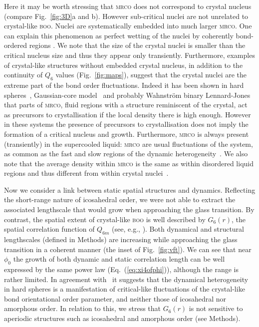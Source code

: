 Here it may be worth stressing that \textsc{mrco} does not correspond to crystal nucleus (compare Fig.~\ref{fig:3D}a and b). However sub-critical nuclei are not unrelated to crystal-like \textsc{boo}. Nuclei are systematically embedded into much larger \textsc{mrco}. One can explain this phenomenon as perfect wetting of the nuclei by coherently bond-ordered regions \cite{Kawasaki2010c}. 
We note that the size of the crystal nuclei is smaller than the critical nucleus size and thus they appear only transiently. 
Furthermore, examples of crystal-like structures without embedded crystal nucleus, in addition to the continuity of $Q_6$ values (Fig.~\ref{fig:maps}), suggest that the crystal nuclei are the extreme part of the bond order fluctuations. 
Indeed it has been shown in hard spheres~\cite{OMalley2005, Schilling2010, Kawasaki2010c}, Gaussian-core model~\cite{Russo2012} and probably Wahnstr\"om binary Lennard-Jones~\cite{Pedersen2010} that parts of \textsc{mrco}, fluid regions with a structure reminiscent of the crystal, act as precursors to crystallisation if the local density there is high enough. However in these systems the presence of precursors to crystallisation does not imply the formation of a critical nucleus and growth. Furthermore, \textsc{mrco} is always present (transiently) in the supercooled liquid: \textsc{mrco} are usual fluctuations of the system, as common as the fast and slow regions of the dynamic heterogeneity~\cite{tanaka2010critical}. We also note that the average density within \textsc{mrco} is the same as within disordered liquid regions and thus different from within crystal nuclei~\cite{Kawasaki2010c}.

Now we consider a link between static spatial structures and dynamics. 
Reflecting the short-range nature of icosahedral order, we were not able to extract the associated lengthscale that would grow when approaching the glass transition. By contrast, the spatial extent of crystal-like \textsc{boo} is well described by $G_6(r)$, the spatial correlation function of $Q_{6 m}$ (see, e.g., \cite{tanaka2010critical}). Both dynamical and structural lengthscales (defined in Methods) are increasing while approaching the glass transition in a coherent manner (the inset of Fig.~\ref{fig:vft}). We can see that near $\phi_0$ the growth of both dynamic and static correlation length can be well expressed by the same power law (Eq.~(\ref{eq:xi4ofphi})), although the range is rather limited. In agreement with~\citep{tanaka2010critical} it suggests that the dynamical heterogeneity in hard spheres is a manifestation of critical-like fluctuations of the crystal-like bond orientational order parameter, and neither those of icosahedral nor amorphous order. In relation to this, we stress that $G_6(r)$ is not sensitive to aperiodic structures such as icosahedral and amorphous order (see Methods). 

